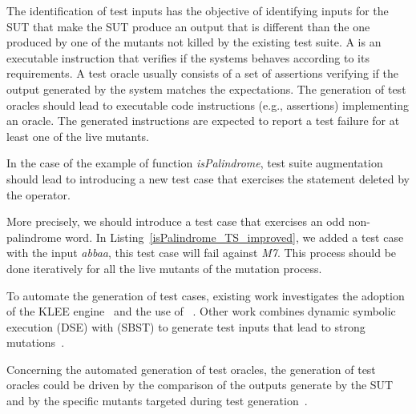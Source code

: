 The identification of test inputs has the objective of identifying inputs for the SUT that make the SUT produce an output that is different than the one produced by one of the mutants not killed by the existing test suite. 
A  is an executable instruction that verifies if the systems behaves according to its requirements. 
A test oracle usually consists of a set of assertions verifying if the output generated by the system matches the expectations.
The generation of test oracles should lead to executable code instructions (e.g., assertions) implementing an oracle. The generated instructions are expected to report a test failure for at least one of the live mutants.


In the case of the example of function \textit{isPalindrome}, test suite augmentation should lead to introducing a new test case that exercises the statement deleted by the operator. 



More precisely, we should introduce a test case that exercises an odd non-palindrome word. In Listing~\ref{isPalindrome_TS_improved}, we added a test case with the input \textit{abbaa}, this test case will fail against \textit{M7}. This process should be done iteratively for all the live mutants of the mutation process. 
 

To automate the generation of test cases, existing work investigates the adoption of the KLEE  engine~\cite{holling2016nequivack} and the use of ~\cite{riener2011test}. Other work combines dynamic symbolic execution (DSE) with  (SBST) to generate test inputs that lead to strong mutations~\cite{harman2011strong}. 


Concerning the automated generation of test oracles, 
the generation of test oracles could be driven by the comparison of the outputs generate by the SUT and by the specific mutants targeted during test generation~\cite{Staats2012}.

